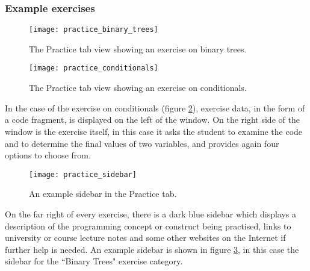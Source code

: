 \newpage
\subsubsection{Example exercises}
\begin{figure}[H]
\centering
\texttt{[image: practice\_binary\_trees]}
\caption{The Practice tab view showing an exercise on binary trees.}
\label{fig:practice_binary_trees}
\end{figure}

\begin{figure}[H]
\centering
\texttt{[image: practice\_conditionals]}
\caption{The Practice tab view showing an exercise on conditionals.}
\label{fig:practice_conditionals}
\end{figure}
\newpage

In the case of the exercise on conditionals (figure \ref{fig:practice_conditionals}), exercise data, in the form of a code fragment, is displayed on the left of the window. On the right side of the window is the exercise itself, in this case it asks the student to examine the code and to determine the final values of two variables, and provides again four options to choose from.

\begin{figure}[H]
\centering
\texttt{[image: practice\_sidebar]}
\caption{An example sidebar in the Practice tab.}
\label{fig:practice_sidebar}
\end{figure}

On the far right of every exercise, there is a dark blue sidebar which displays a description of the programming concept or construct being practised, links to university or course lecture notes and some other websites on the Internet if further help is needed. An example sidebar is shown in figure \ref{fig:practice_sidebar}, in this case the sidebar for the ``Binary Trees" exercise category.


